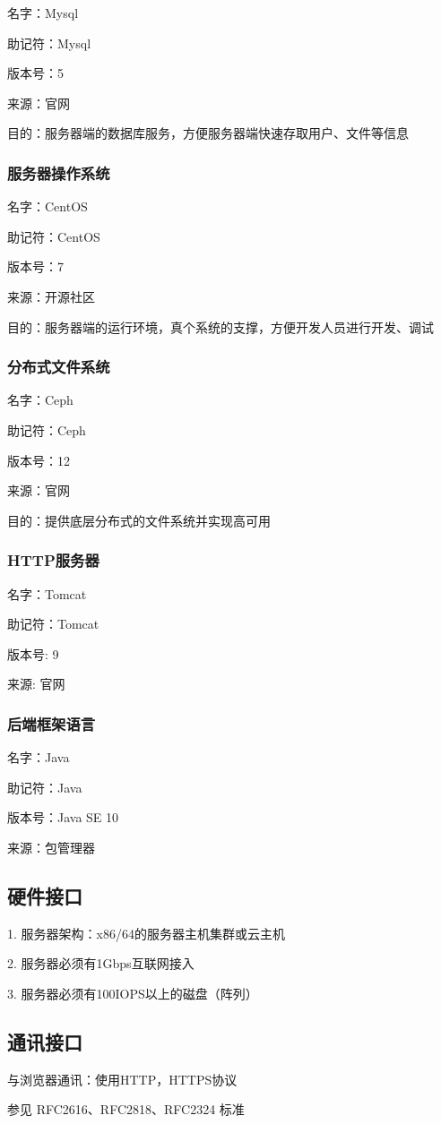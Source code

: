 名字：Mysql

助记符：Mysql

版本号：5

来源：官网

目的：服务器端的数据库服务，方便服务器端快速存取用户、文件等信息

\subsubsection{服务器操作系统}

名字：CentOS 

助记符：CentOS

版本号：7

来源：开源社区

目的：服务器端的运行环境，真个系统的支撑，方便开发人员进行开发、调试

\subsubsection{分布式文件系统}

名字：Ceph

助记符：Ceph 

版本号：12

来源：官网

目的：提供底层分布式的文件系统并实现高可用

\subsubsection{HTTP服务器}

名字：Tomcat

助记符：Tomcat

版本号: 9

来源: 官网

\subsubsection{后端框架语言}

名字：Java

助记符：Java

版本号：Java SE 10

来源：包管理器 

\subsection{硬件接口}

1. 服务器架构：x86/64的服务器主机集群或云主机

2. 服务器必须有1Gbps互联网接入

3. 服务器必须有100IOPS以上的磁盘（阵列）

\subsection{通讯接口}

与浏览器通讯：使用HTTP，HTTPS协议

参见 RFC2616、RFC2818、RFC2324 标准


